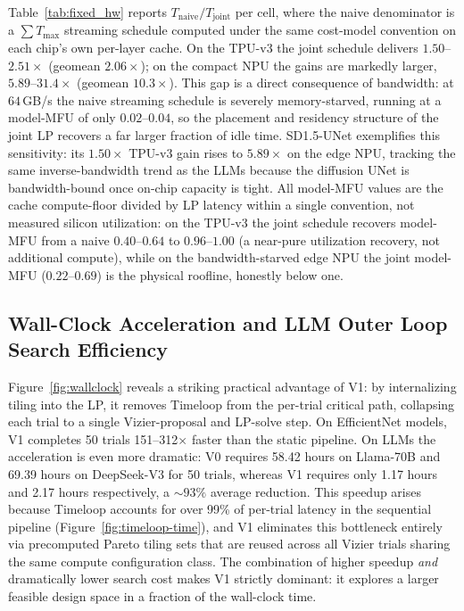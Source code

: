 Table~\ref{tab:fixed_hw} reports $T_{\text{naive}}/T_{\text{joint}}$ per cell, where the naive denominator is a $\sum T_{\max}$ streaming schedule computed under the same cost-model convention on each chip's own per-layer cache. On the TPU-v3 the joint schedule delivers $1.50$--$2.51\times$ (geomean $2.06\times$); on the compact NPU the gains are markedly larger, $5.89$--$31.4\times$ (geomean $10.3\times$). This gap is a direct consequence of bandwidth: at $64$\,GB/s the naive streaming schedule is severely memory-starved, running at a model-MFU of only $0.02$--$0.04$, so the placement and residency structure of the joint LP recovers a far larger fraction of idle time. SD1.5-UNet exemplifies this sensitivity: its $1.50\times$ TPU-v3 gain rises to $5.89\times$ on the edge NPU, tracking the same inverse-bandwidth trend as the LLMs because the diffusion UNet is bandwidth-bound once on-chip capacity is tight. All model-MFU values are the cache compute-floor divided by LP latency within a single convention, not measured silicon utilization: on the TPU-v3 the joint schedule recovers model-MFU from a naive $0.40$--$0.64$ to $0.96$--$1.00$ (a near-pure utilization recovery, not additional compute), while on the bandwidth-starved edge NPU the joint model-MFU ($0.22$--$0.69$) is the physical roofline, honestly below one.

\subsection{Wall-Clock Acceleration and LLM Outer Loop Search Efficiency}
\label{sec:breakdown}
Figure~\ref{fig:wallclock} reveals a striking practical advantage of V1: by internalizing tiling into the LP, it removes Timeloop from the per-trial critical path, collapsing each trial to a single Vizier-proposal and LP-solve step. On EfficientNet models, V1 completes 50 trials 151--312$\times$ faster than the static pipeline. On LLMs the acceleration is even more dramatic: V0 requires 58.42 hours on Llama-70B and 69.39 hours on DeepSeek-V3 for 50 trials, whereas V1 requires only 1.17 hours and 2.17 hours respectively, a ${\sim}93\%$ average reduction. This speedup arises because Timeloop accounts for over 99\% of per-trial latency in the sequential pipeline (Figure~\ref{fig:timeloop-time}), and V1 eliminates this bottleneck entirely via precomputed Pareto tiling sets that are reused across all Vizier trials sharing the same compute configuration class. The combination of higher speedup \emph{and} dramatically lower search cost makes V1 strictly dominant: it explores a larger feasible design space in a fraction of the wall-clock time. 

